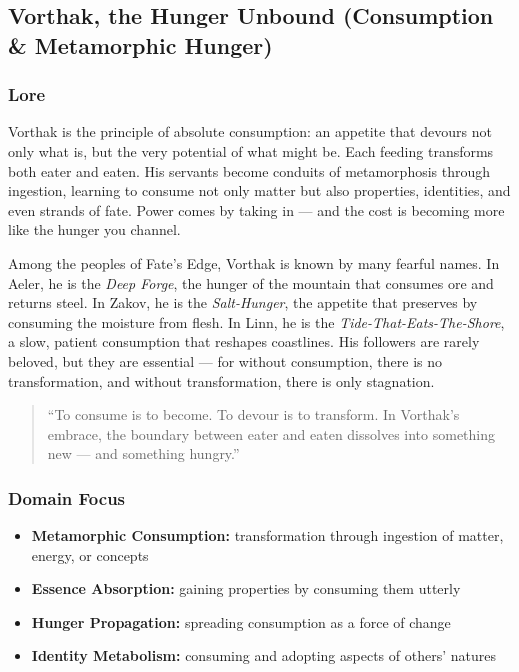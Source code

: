 
\subsection{Vorthak, the Hunger Unbound (Consumption \& Metamorphic Hunger)}

\subsubsection*{Lore}
Vorthak is the principle of absolute consumption: an appetite that devours not only what is, but the very potential of what might be. Each feeding transforms both eater and eaten. His servants become conduits of metamorphosis through ingestion, learning to consume not only matter but also properties, identities, and even strands of fate. Power comes by taking in --- and the cost is becoming more like the hunger you channel.

Among the peoples of Fate's Edge, Vorthak is known by many fearful names. In Aeler, he is the \textit{Deep Forge}, the hunger of the mountain that consumes ore and returns steel. In Zakov, he is the \textit{Salt-Hunger}, the appetite that preserves by consuming the moisture from flesh. In Linn, he is the \textit{Tide-That-Eats-The-Shore}, a slow, patient consumption that reshapes coastlines. His followers are rarely beloved, but they are essential --- for without consumption, there is no transformation, and without transformation, there is only stagnation.

\begin{quote}
``To consume is to become. To devour is to transform. In Vorthak's embrace, the boundary between eater and eaten dissolves into something new --- and something hungry.''
\end{quote}

\subsubsection*{Domain Focus}
\begin{itemize}
  \item \textbf{Metamorphic Consumption:} transformation through ingestion of matter, energy, or concepts
  \item \textbf{Essence Absorption:} gaining properties by consuming them utterly
  \item \textbf{Hunger Propagation:} spreading consumption as a force of change
  \item \textbf{Identity Metabolism:} consuming and adopting aspects of others' natures
\end{itemize}

